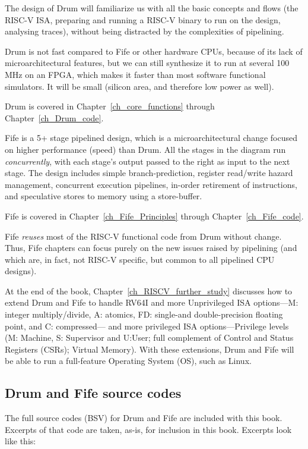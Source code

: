The design of Drum will familiarize us with all the basic concepts and
flows (the RISC-V ISA, preparing and running a RISC-V binary to run on
the design, analysing traces), without being distracted by the
complexities of pipelining.

Drum is not fast compared to Fife or other hardware CPUs, because of
its lack of microarchitectural features, but we can still synthesize
it to run at several 100 MHz on an FPGA, which makes it faster than
most software functional simulators.  It will be small (silicon area,
and therefore low power as well).

Drum is covered in Chapter~\ref{ch_core_functions} through
Chapter~\ref{ch_Drum_code}.

Fife is a 5+ stage pipelined design, which is a microarchitectural
change focused on higher performance (speed) than Drum.  All the
stages in the diagram run \emph{concurrently}, with each stage's
output passed to the right as input to the next stage.  The design
includes simple branch-prediction, register read/write hazard
management, concurrent execution pipelines, in-order retirement of
instructions, and speculative stores to memory using a store-buffer.

Fife is covered in Chapter~\ref{ch_Fife_Principles} through
Chapter~\ref{ch_Fife_code}.

Fife \emph{reuses} most of the RISC-V functional code from Drum
without change.  Thus, Fife chapters can focus purely on the new
issues raised by pipelining (and which are, in fact, not RISC-V
specific, but common to all pipelined CPU designs).

At the end of the book, Chapter~\ref{ch_RISCV_further_study} discusses
how to extend Drum and Fife to handle RV64I and more Unprivileged ISA
options---M: integer multiply/divide, A: atomics, FD: single-and
double-precision floating point, and C: compressed--- and more
privileged ISA options---Privilege levels (M: Machine, S: Supervisor
and U:User; full complement of Control and Status Registers (CSRs);
Virtual Memory).  With these extensions, Drum and Fife will be able to
run a full-feature Operating System (OS), such as Linux.


\subsection{Drum and Fife source codes}

The full source codes (BSV) for Drum and Fife are included with this
book.  Excerpts of that code are taken, as-is, for inclusion in this
book.  Excerpts look like this:

